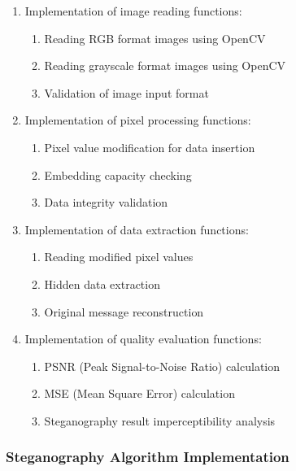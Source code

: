 \documentclass{ittelkom}
\begin{document}
\begin{enumerate}
    \item Implementation of image reading functions:
          \begin{enumerate}
              \item Reading RGB format images using OpenCV
              \item Reading grayscale format images using OpenCV
              \item Validation of image input format
          \end{enumerate}

    \item Implementation of pixel processing functions:
          \begin{enumerate}
              \item Pixel value modification for data insertion
              \item Embedding capacity checking
              \item Data integrity validation
          \end{enumerate}

    \item Implementation of data extraction functions:
          \begin{enumerate}
              \item Reading modified pixel values
              \item Hidden data extraction
              \item Original message reconstruction
          \end{enumerate}

    \item Implementation of quality evaluation functions:
          \begin{enumerate}
              \item PSNR (Peak Signal-to-Noise Ratio) calculation
              \item MSE (Mean Square Error) calculation
              \item Steganography result imperceptibility analysis
          \end{enumerate}
\end{enumerate}

\subsubsection{Steganography Algorithm Implementation}
\end{document}
